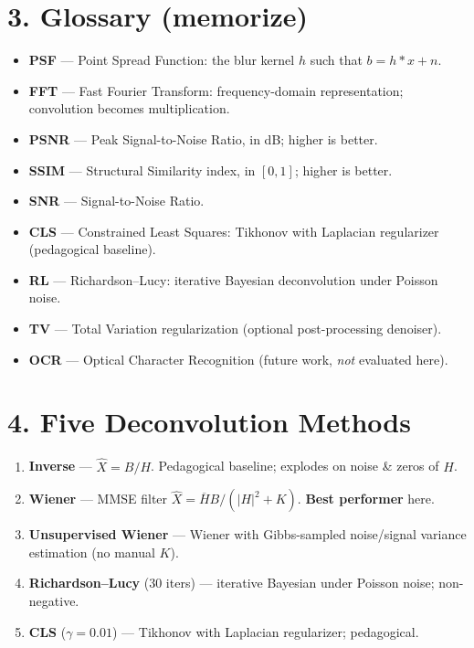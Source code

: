 \documentclass[10pt,a4paper]{article}
\begin{document}
\section*{3. Glossary (memorize)}
\begin{itemize}
  \item \textbf{PSF} --- Point Spread Function: the blur kernel $h$ such that $b = h \ast x + n$.
  \item \textbf{FFT} --- Fast Fourier Transform: frequency-domain representation; convolution becomes multiplication.
  \item \textbf{PSNR} --- Peak Signal-to-Noise Ratio, in dB; higher is better.
  \item \textbf{SSIM} --- Structural Similarity index, in $[0,1]$; higher is better.
  \item \textbf{SNR} --- Signal-to-Noise Ratio.
  \item \textbf{CLS} --- Constrained Least Squares: Tikhonov with Laplacian regularizer (pedagogical baseline).
  \item \textbf{RL} --- Richardson--Lucy: iterative Bayesian deconvolution under Poisson noise.
  \item \textbf{TV} --- Total Variation regularization (optional post-processing denoiser).
  \item \textbf{OCR} --- Optical Character Recognition (future work, \emph{not} evaluated here).
\end{itemize}

\section*{4. Five Deconvolution Methods}
\begin{enumerate}
  \item \textbf{Inverse} --- $\hat X = B / H$. Pedagogical baseline; explodes on noise \& zeros of $H$.
  \item \textbf{Wiener} --- MMSE filter $\hat X = \overline{H} B / (|H|^2 + K)$. \textbf{Best performer} here.
  \item \textbf{Unsupervised Wiener} --- Wiener with Gibbs-sampled noise/signal variance estimation (no manual $K$).
  \item \textbf{Richardson--Lucy} (30 iters) --- iterative Bayesian under Poisson noise; non-negative.
  \item \textbf{CLS} ($\gamma{=}0.01$) --- Tikhonov with Laplacian regularizer; pedagogical.
\end{enumerate}
\end{document}
